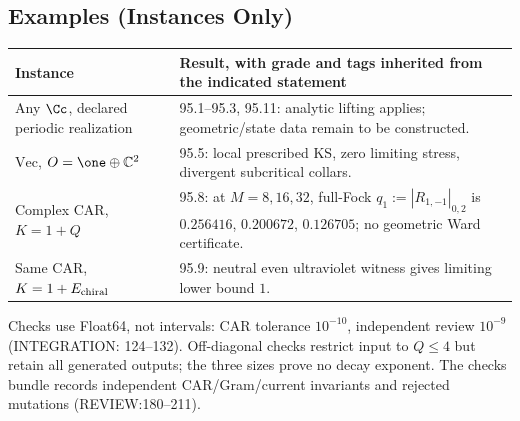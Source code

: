 \subsection{Examples (Instances Only)}
\begin{center}\footnotesize
\begin{tabular}{p{3.0cm}p{10.7cm}}
\toprule Instance & Result, with grade and tags inherited from the indicated statement \\
\midrule
Any \(\Cc\), declared periodic realization & 95.1--95.3, 95.11: analytic lifting applies; geometric/state data remain to be constructed. \\
\(\mathrm{Vec}\), \(O=\one\oplus\mathbb C^2\) & 95.5: local prescribed KS, zero limiting stress, divergent subcritical collars. \\
Complex CAR, \(K=1+Q\) & 95.8: at \(M=8,16,32\), full-Fock \(q_1:=|R_{1,-1}|_{0,2}\) is \(0.256416\), \(0.200672\), \(0.126705\); no geometric Ward certificate. \\
Same CAR, \(K=1+E_{\rm chiral}\) & 95.9: neutral even ultraviolet witness gives limiting lower bound \(1\). \\
\bottomrule\end{tabular}
\end{center}
Checks use Float64, not intervals: CAR tolerance \(10^{-10}\), independent review \(10^{-9}\)
(INTEGRATION: 124--132).
Off-diagonal checks restrict input to \(Q\le4\) but retain all generated outputs; the three sizes prove no decay exponent.
The checks bundle records independent CAR/Gram/current invariants and rejected mutations (REVIEW:180--211).

